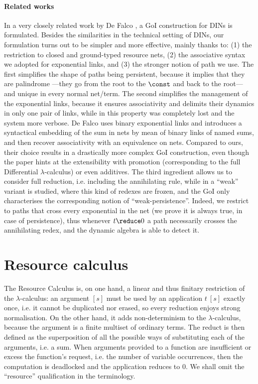 \paragraph{Related works}
In a very closely related work by De Falco \cite{DeFalco:2008}, a GoI 
construction for DINs is formulated.
Besides the similarities in the technical setting of DINs, our formulation 
turns out to be simpler and more effective, mainly thanks to:
(1) the restriction to closed and ground-typed resource nets,
(2) the associative syntax we adopted for exponential links, and
(3) the stronger notion of path we use.
The first simplifies the shape of paths being persistent, because it implies 
that they are palindrome ---they go from the root to the $\const$ and back to 
the root--- and unique in every normal net/term.
The second simplifies the management of the exponential links, because 
it ensures associativity and delimits their dynamics in only one pair of links, 
while in \cite{DeFalco:2008} this property was completely lost and the system 
more verbose.
De Falco uses binary exponential links and introduces a syntactical embedding 
of the sum in nets by mean of binary links of named sums, and then recover 
associativity with an equivalence on nets.
Compared to ours, their choice results in a drastically more complex 
GoI construction, even though the paper hints at the extensibility with 
promotion (corresponding to the full Differential $\lambda$-calculus) or even 
additives.
The third ingredient allows us to consider full reduction, 
i.e. including the annihilating rule, while in \cite{DeFalco:2008} a 
``weak'' variant is studied, where this kind of redexes are frozen, and 
the GoI only characterises the corresponding notion of ``weak-persistence''.
Indeed, we restrict to paths that cross every exponential in the net (we 
prove it is always true, in case of persistence), thus whenever $t \reduce 0$ 
a path necessarily crosses the annihilating redex, and the dynamic algebra is 
able to detect it.

\section{Resource calculus}
\label{sec:terms}

The Resource Calculus is, on one hand, a linear and thus finitary restriction 
of the $\lambda$-calculus: an argument $[s]$ must be used by an application 
$t\ [s]$ exactly once, i.e. it cannot be duplicated nor erased, so every 
reduction enjoys strong normalisation.
On the other hand, it adds non-determinism to the $\lambda$-calculus, because 
the argument is a finite multiset of ordinary terms.
The reduct is then defined as the superposition of all the possible ways of 
substituting each of the arguments, i.e. a sum.
When arguments provided to a function are insufficient or excess the 
function's request, i.e. the number of variable occurrences, then the 
computation is deadlocked and the application reduces to $0$.
We shall omit the ``resource'' qualification in the terminology.

